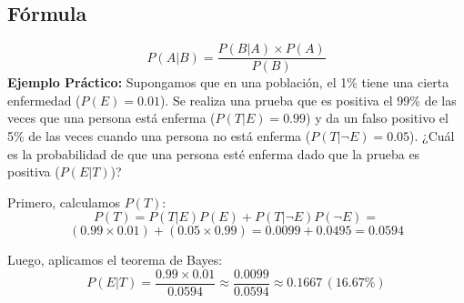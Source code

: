 \documentclass[10pt]{article}
\begin{document}
\begin{multicols}{2}
		\subsection*{Fórmula}
		\[
		P(A|B) = \frac{P(B|A) \times P(A)}{P(B)}
		\]
		\textbf{Ejemplo Práctico:}  
		Supongamos que en una población, el 1\% tiene una cierta enfermedad (\( P(E) = 0.01 \)). Se realiza una prueba que es positiva el 99\% de las veces que una persona está enferma (\( P(T|E) = 0.99 \)) y da un falso positivo el 5\% de las veces cuando una persona no está enferma (\( P(T|\neg E) = 0.05 \)). ¿Cuál es la probabilidad de que una persona esté enferma dado que la prueba es positiva (\( P(E|T) \))?
		
		Primero, calculamos \( P(T) \):
		\[
		P(T) = P(T|E)P(E) + P(T|\neg E)P(\neg E) = 
		\]
		\[
		(0.99 \times 0.01) + (0.05 \times 0.99) = 0.0099 + 0.0495 = 0.0594
		\]
		
		
		Luego, aplicamos el teorema de Bayes:
		\[
		P(E|T) = \frac{0.99 \times 0.01}{0.0594} \approx \frac{0.0099}{0.0594} \approx 0.1667 \, (16.67\%)
		\]
	\end{multicols}
	
	\newpage
	
\end{document}

